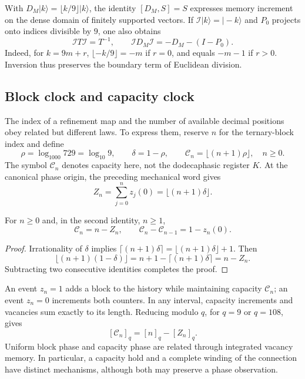 With \(D_M|k\rangle=\lfloor k/9\rfloor|k\rangle\), the identity
\([D_M,S]=S\) expresses memory increment on the dense domain of
finitely supported vectors. If \(\mathcal I|k\rangle=|-k\rangle\) and
\(P_0\) projects onto indices divisible by \(9\), one also obtains
\begin{equation}
 \mathcal I T\mathcal I=T^{-1},\qquad
 \mathcal I D_M\mathcal I=-D_M-(I-P_0).
 \label{mono-ampl:inversion-contador}
\end{equation}
Indeed, for \(k=9m+r\),
\(\lfloor-k/9\rfloor=-m\) if \(r=0\), and equals \(-m-1\) if \(r>0\).
Inversion thus preserves the boundary term of Euclidean division.

\subsection{Block clock and capacity clock}
\label{mono-ampl:relojes}

The index of a refinement map and the number of available decimal
positions obey related but different laws. To
express them, reserve \(n\) for the ternary-block index and define
\[
 \rho=\log_{1000}729=\log_{10}9,\qquad
 \delta=1-\rho,\qquad
 \mathcal C_n=\lfloor(n+1)\rho\rfloor,\quad n\geq0.
\]
The symbol \(\mathcal C_n\) denotes capacity here, not the dodecaphasic
register \(K\). At the canonical phase origin, the preceding mechanical
word gives
\[
 Z_n=\sum_{j=0}^{n}z_j(0)=\lfloor(n+1)\delta\rfloor.
\]

\begin{proposition}
\label{mono-ampl:balance-capacidad}
For \(n\geq0\) and, in the second identity, \(n\geq1\),
\[
 \mathcal C_n=n-Z_n,\qquad
 \mathcal C_n-\mathcal C_{n-1}=1-z_n(0).
\]
\end{proposition}
\begin{proof}
Irrationality of \(\delta\) implies
\(\lceil(n+1)\delta\rceil=\lfloor(n+1)\delta\rfloor+1\).
Then
\[
 \lfloor(n+1)(1-\delta)\rfloor
 =n+1-\lceil(n+1)\delta\rceil=n-Z_n.
\]
Subtracting two consecutive identities completes the proof.
\end{proof}

An event \(z_n=1\) adds a block to the history while maintaining capacity
\(\mathcal C_n\); an event \(z_n=0\) increments both counters. In
any interval, capacity increments and vacancies sum
exactly to its length. Reducing modulo \(q\), for \(q=9\) or
\(q=108\), gives
\[
 [\mathcal C_n]_q=[n]_q-[Z_n]_q.
\]
Uniform block phase and capacity phase are related through
integrated vacancy memory. In particular, a capacity hold
and a complete winding of the connection have distinct mechanisms,
although both may preserve a phase observation.


